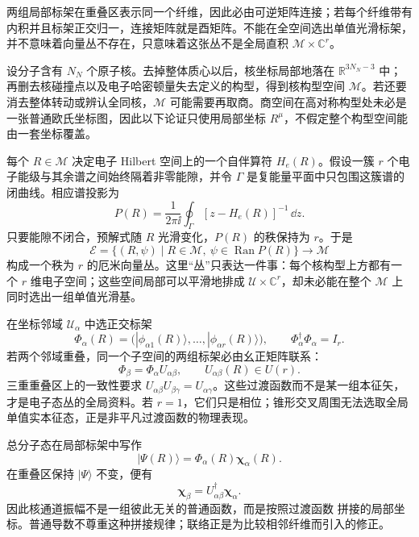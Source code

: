 两组局部标架在重叠区表示同一个纤维，因此必由可逆矩阵连接；若每个纤维带有内积并且标架正交归一，连接矩阵就是酉矩阵。不能在全空间选出单值光滑标架，并不意味着向量丛不存在，只意味着这张丛不是全局直积
\(\mathcal M\times\mathbb C^r\)。

设分子含有 \(N_N\) 个原子核。去掉整体质心以后，核坐标局部地落在 \(\mathbb R^{3N_N-3}\) 中；再删去核碰撞点以及电子哈密顿量失去定义的构型，得到核构型空间 \(\mathcal M\)。若还要消去整体转动或辨认全同核，\(\mathcal M\) 可能需要再取商。商空间在高对称构型处未必是一张普通欧氏坐标图，因此以下论证只使用局部坐标 \(R^\mu\)，不假定整个构型空间能由一套坐标覆盖。

每个 \(R\in\mathcal M\) 决定电子 Hilbert 空间上的一个自伴算符 \(H_e(R)\)。假设一簇 \(r\) 个电子能级与其余谱之间始终隔着非零能隙，并令 \(\Gamma\) 是复能量平面中只包围这簇谱的闭曲线。相应谱投影为
\begin{equation}
P(R)=\frac{1}{2\pi\ii}\oint_\Gamma
[z-H_e(R)]^{-1}\,\dd z .
\label{eq:riesz-electronic-projector}
\end{equation}
只要能隙不闭合，预解式随 \(R\) 光滑变化，\(P(R)\) 的秩保持为 \(r\)。于是
\begin{equation}
\mathcal E
=\{(R,\psi)\mid R\in\mathcal M,
\ \psi\in\operatorname{Ran}P(R)\}
\longrightarrow\mathcal M
\label{eq:electronic-vector-bundle}
\end{equation}
构成一个秩为 \(r\) 的厄米向量丛。这里“丛”只表达一件事：每个核构型上方都有一个 \(r\) 维电子空间；这些空间局部可以平滑地排成 \(\mathcal U\times\mathbb C^r\)，却未必能在整个 \(\mathcal M\) 上同时选出一组单值光滑基。

在坐标邻域 \(\mathcal U_\alpha\) 中选正交标架
\[
\Phi_\alpha(R)
=\bigl(|\phi_{\alpha1}(R)\rangle,\ldots,
|\phi_{\alpha r}(R)\rangle\bigr),
\qquad
\Phi_\alpha^\dagger\Phi_\alpha=I_r .
\]
若两个邻域重叠，同一个子空间的两组标架必由幺正矩阵联系：
\begin{equation}
\Phi_\beta=\Phi_\alpha U_{\alpha\beta},
\qquad U_{\alpha\beta}(R)\in U(r).
\label{eq:electronic-transition-function}
\end{equation}
三重重叠区上的一致性要求
\(U_{\alpha\beta}U_{\beta\gamma}=U_{\alpha\gamma}\)。这些过渡函数而不是某一组本征矢，才是电子态丛的全局资料。若 \(r=1\)，它们只是相位；锥形交叉周围无法选取全局单值实本征态，正是非平凡过渡函数的物理表现。

总分子态在局部标架中写作
\[
|\Psi(R)\rangle=\Phi_\alpha(R)\boldsymbol\chi_\alpha(R).
\]
在重叠区保持 \(|\Psi\rangle\) 不变，便有
\begin{equation}
\boldsymbol\chi_\beta
=U_{\alpha\beta}^\dagger\boldsymbol\chi_\alpha .
\label{eq:nuclear-amplitude-transition}
\end{equation}
因此核通道振幅不是一组彼此无关的普通函数，而是按照过渡函数  拼接的局部坐标。普通导数不尊重这种拼接规律；联络正是为比较相邻纤维而引入的修正。

